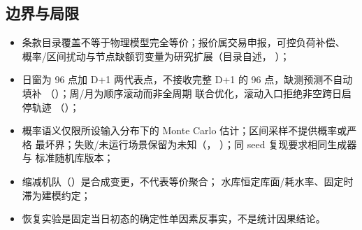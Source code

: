\subsection{边界与局限}
\begin{itemize}
  \item 条款目录覆盖不等于物理模型完全等价；报价属交易申报，可控负荷补偿、
        概率/区间扰动与节点缺额罚变量为研究扩展（目录自述，
        ）；
  \item 日窗为 96 点加 D+1 两代表点，不接收完整 D+1 的 96 点，缺测预测不自动填补
        （）；周/月为顺序滚动而非全周期
        联合优化，滚动入口拒绝非空跨日启停轨迹
        （）；
  \item 概率语义仅限所设输入分布下的 Monte Carlo 估计；区间采样不提供概率或严格
        最坏界；失败/未运行场景保留为未知（，
        ）；同 seed 复现要求相同生成器与
        标准随机库版本；
  \item 缩减机队（）是合成变更，不代表等价聚合；
        水库恒定库面/耗水率、固定时滞为建模约定；
  \item 恢复实验是固定当日初态的确定性单因素反事实，不是统计因果结论。
\end{itemize}
